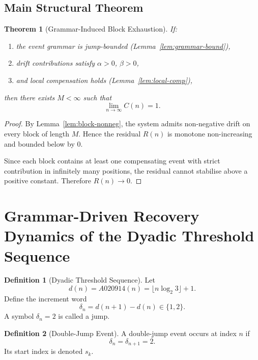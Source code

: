 \documentclass[12pt, oneside]{article}
\numberwithin{equation}{section}
\theoremstyle{definition}
\newtheorem{definition}{Definition}[section]
\theoremstyle{plain}
\newtheorem{theorem}{Theorem}[section]
\theoremstyle{remark}
\begin{document}
\subsection{Main Structural Theorem}

\begin{theorem}[Grammar-Induced Block Exhaustion]
\label{thm:block-exhaustion-final}
If:
\begin{enumerate}
\item the event grammar is jump-bounded (Lemma~\ref{lem:grammar-bound}),
\item drift contributions satisfy $\alpha > 0$, $\beta > 0$,
\item and local compensation holds (Lemma~\ref{lem:local-comp}),
\end{enumerate}
then there exists $M < \infty$ such that
\[
\lim_{n \to \infty} C(n) = 1.
\]
\end{theorem}

\begin{proof}
By Lemma~\ref{lem:block-nonneg}, the system admits non-negative drift
on every block of length $M$. Hence the residual $R(n)$ is monotone
non-increasing and bounded below by $0$.

Since each block contains at least one compensating event with
strict contribution in infinitely many positions, the residual cannot
stabilise above a positive constant. Therefore $R(n) \to 0$.
\end{proof}

\section{Grammar-Driven Recovery Dynamics of the Dyadic Threshold Sequence}

\begin{definition}[Dyadic Threshold Sequence]
Let
\[
d(n)=A020914(n)=\lfloor n\log_2 3\rfloor+1.
\]
Define the increment word
\[
\delta_n=d(n+1)-d(n)\in\{1,2\}.
\]
A symbol $\delta_n=2$ is called a jump.
\end{definition}

\begin{definition}[Double-Jump Event]
A double-jump event occurs at index $n$ if
\[
\delta_n=\delta_{n+1}=2.
\]
Its start index is denoted $s_k$.
\end{definition}
\end{document}
